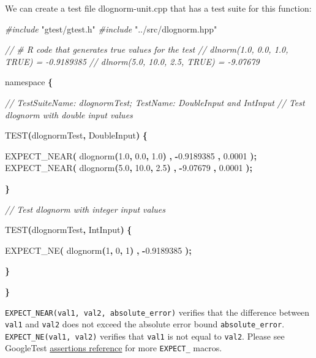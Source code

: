 \documentclass[
]{book}
\newenvironment{Shaded}{\begin{snugshade}}{\end{snugshade}}
\newcommand{\CommentTok}[1]{\textcolor[rgb]{0.56,0.35,0.01}{\textit{#1}}}
\newcommand{\DecValTok}[1]{\textcolor[rgb]{0.00,0.00,0.81}{#1}}
\newcommand{\FloatTok}[1]{\textcolor[rgb]{0.00,0.00,0.81}{#1}}
\newcommand{\ImportTok}[1]{#1}
\newcommand{\NormalTok}[1]{#1}
\newcommand{\OperatorTok}[1]{\textcolor[rgb]{0.81,0.36,0.00}{\textbf{#1}}}
\newcommand{\PreprocessorTok}[1]{\textcolor[rgb]{0.56,0.35,0.01}{\textit{#1}}}
\begin{document}
We can create a test file dlognorm-unit.cpp that has a test suite for this function:

\begin{Shaded}
\begin{Highlighting}[]
\PreprocessorTok{\#include }\ImportTok{"gtest/gtest.h"}
\PreprocessorTok{\#include }\ImportTok{"../src/dlognorm.hpp"}

\CommentTok{// \# R code that generates true values for the test}
\CommentTok{// dlnorm(1.0, 0.0, 1.0, TRUE) = {-}0.9189385}
\CommentTok{// dlnorm(5.0, 10.0, 2.5, TRUE) = {-}9.07679}

\NormalTok{namespace }\OperatorTok{\{}

  \CommentTok{// TestSuiteName: dlognormTest; TestName: DoubleInput and IntInput}
  \CommentTok{// Test dlognorm with double input values}
  
\NormalTok{  TEST}\OperatorTok{(}\NormalTok{dlognormTest}\OperatorTok{,}\NormalTok{ DoubleInput}\OperatorTok{)} \OperatorTok{\{}
    
\NormalTok{    EXPECT\_NEAR}\OperatorTok{(}\NormalTok{ dlognorm}\OperatorTok{(}\FloatTok{1.0}\OperatorTok{,} \FloatTok{0.0}\OperatorTok{,} \FloatTok{1.0}\OperatorTok{)} \OperatorTok{,} \OperatorTok{{-}}\FloatTok{0.9189385} \OperatorTok{,} \FloatTok{0.0001} \OperatorTok{);} 
\NormalTok{    EXPECT\_NEAR}\OperatorTok{(}\NormalTok{ dlognorm}\OperatorTok{(}\FloatTok{5.0}\OperatorTok{,} \FloatTok{10.0}\OperatorTok{,} \FloatTok{2.5}\OperatorTok{)} \OperatorTok{,} \OperatorTok{{-}}\FloatTok{9.07679} \OperatorTok{,} \FloatTok{0.0001} \OperatorTok{);} 
    
  \OperatorTok{\}}
  
  \CommentTok{// Test dlognorm with integer input values}
  
\NormalTok{  TEST}\OperatorTok{(}\NormalTok{dlognormTest}\OperatorTok{,}\NormalTok{ IntInput}\OperatorTok{)} \OperatorTok{\{}
    
\NormalTok{    EXPECT\_NE}\OperatorTok{(}\NormalTok{ dlognorm}\OperatorTok{(}\DecValTok{1}\OperatorTok{,} \DecValTok{0}\OperatorTok{,} \DecValTok{1}\OperatorTok{)} \OperatorTok{,} \OperatorTok{{-}}\FloatTok{0.9189385} \OperatorTok{);}
    
  \OperatorTok{\}}
  
\OperatorTok{\}}
\end{Highlighting}
\end{Shaded}

\texttt{EXPECT\_NEAR(val1,\ val2,\ absolute\_error)} verifies that the difference between \texttt{val1} and \texttt{val2} does not exceed the absolute error bound \texttt{absolute\_error}. \texttt{EXPECT\_NE(val1,\ val2)} verifies that \texttt{val1} is not equal to \texttt{val2}. Please see GoogleTest \href{https://google.github.io/googletest/reference/assertions.html}{assertions reference} for more \texttt{EXPECT\_} macros.
\end{document}
